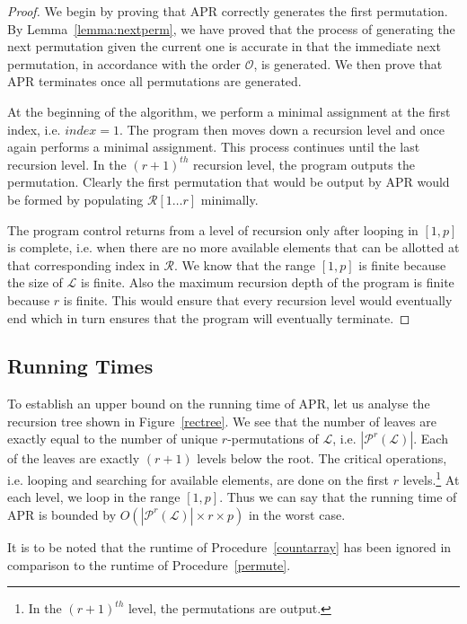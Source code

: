 \documentclass{article}
\begin{document}
\begin{proof}
 We begin by proving that APR correctly generates the first permutation. By Lemma~\ref{lemma:nextperm}, we have proved that the process of generating the next permutation given the current one is accurate in that the immediate next permutation, in accordance with the order $\mathcal{O}$, is generated. We then prove that APR terminates once all permutations are generated.

At the beginning of the algorithm, we perform a minimal assignment at the first index, i.e. $index=1$. The program then moves down a recursion level and once again performs a minimal assignment. This process continues until the last recursion level. In the $(r+1)^{th}$ recursion level, the program outputs the permutation. Clearly the first permutation that would be output by APR would be formed by populating $\mathcal{R}[1 \ldots r]$ minimally.

The program control returns from a level of recursion only after looping in $[1, p]$ is complete, i.e. when there are no more available elements that can be allotted at that corresponding index in $\mathcal{R}$. We know that the range $[1, p]$ is finite because the size of $\mathcal{L}$ is finite. Also the maximum recursion depth of the program is finite because $r$ is finite. This would ensure that every recursion level would eventually end which in turn ensures that the program will eventually terminate. \end{proof}

\subsection{Running Times}
\label{sec:anal:subsec:runtime}

To establish an upper bound on the running time of APR, let us analyse the recursion tree shown in Figure~\ref{rectree}. We see that the number of leaves are exactly equal to the number of unique $r$-permutations of $\mathcal{L}$, i.e. $|\mathcal{P}^r(\mathcal{L})|$. Each of the leaves are exactly $(r+1)$ levels below the root. The critical operations, i.e. looping and searching for available elements, are done on the first $r$ levels.\footnote{In the $(r+1)^{th}$ level, the permutations are output.} At each level, we loop in the range $[1, p]$. Thus we can say that the running time of APR is bounded by $O\left(|\mathcal{P}^r(\mathcal{L})| \times r \times p\right)$ in the worst case.

It is to be noted that the runtime of Procedure~\ref{countarray} has been ignored in comparison to the runtime of Procedure~\ref{permute}.
\end{document}
